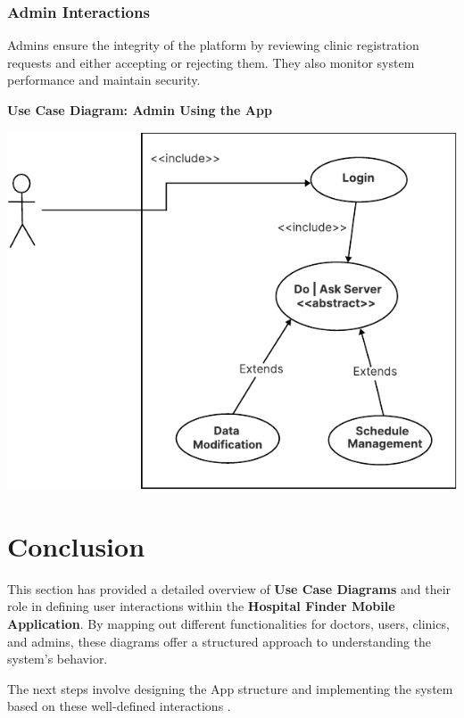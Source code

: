 \documentclass[12pt]{report}
\begin{document}
\subsubsection{\textbf{Admin Interactions}}
Admins ensure the integrity of the platform by reviewing clinic registration requests and either accepting or rejecting them. They also monitor system performance and maintain security.

\vspace{0.5cm}
\noindent \textbf{Use Case Diagram: Admin Using the App}
\begin{center}
	\includegraphics[width=\textwidth]{images/doctorCAS.pdf} %
\end{center}

\section{\textbf{Conclusion}}
\noindent This section has provided a detailed overview of \textbf{Use Case Diagrams} and their role in defining user interactions within the \textbf{Hospital Finder Mobile Application}. By mapping out different functionalities for doctors, users, clinics, and admins, these diagrams offer a structured approach to understanding the system's behavior.

\noindent The next steps involve designing the App structure and implementing the system based on these well-defined interactions .
\end{document}
